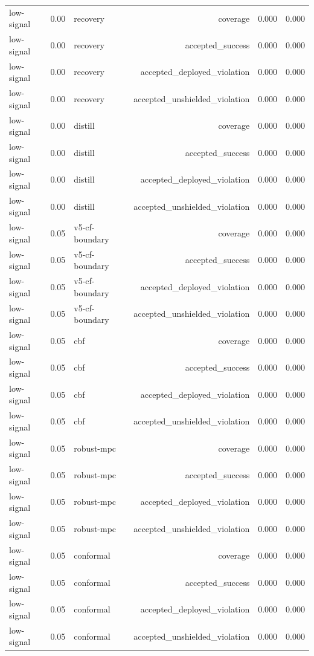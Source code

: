 \documentclass{article}
\begin{document}
\begin{longtable}{@{}lllrrr@{}}
low-signal & 0.00 & recovery & coverage & 0.000 & 0.000 \\
low-signal & 0.00 & recovery & accepted\_success & 0.000 & 0.000 \\
low-signal & 0.00 & recovery & accepted\_deployed\_violation & 0.000 & 0.000 \\
low-signal & 0.00 & recovery & accepted\_unshielded\_violation & 0.000 & 0.000 \\
low-signal & 0.00 & distill & coverage & 0.000 & 0.000 \\
low-signal & 0.00 & distill & accepted\_success & 0.000 & 0.000 \\
low-signal & 0.00 & distill & accepted\_deployed\_violation & 0.000 & 0.000 \\
low-signal & 0.00 & distill & accepted\_unshielded\_violation & 0.000 & 0.000 \\
low-signal & 0.05 & v5-cf-boundary & coverage & 0.000 & 0.000 \\
low-signal & 0.05 & v5-cf-boundary & accepted\_success & 0.000 & 0.000 \\
low-signal & 0.05 & v5-cf-boundary & accepted\_deployed\_violation & 0.000 & 0.000 \\
low-signal & 0.05 & v5-cf-boundary & accepted\_unshielded\_violation & 0.000 & 0.000 \\
low-signal & 0.05 & cbf & coverage & 0.000 & 0.000 \\
low-signal & 0.05 & cbf & accepted\_success & 0.000 & 0.000 \\
low-signal & 0.05 & cbf & accepted\_deployed\_violation & 0.000 & 0.000 \\
low-signal & 0.05 & cbf & accepted\_unshielded\_violation & 0.000 & 0.000 \\
low-signal & 0.05 & robust-mpc & coverage & 0.000 & 0.000 \\
low-signal & 0.05 & robust-mpc & accepted\_success & 0.000 & 0.000 \\
low-signal & 0.05 & robust-mpc & accepted\_deployed\_violation & 0.000 & 0.000 \\
low-signal & 0.05 & robust-mpc & accepted\_unshielded\_violation & 0.000 & 0.000 \\
low-signal & 0.05 & conformal & coverage & 0.000 & 0.000 \\
low-signal & 0.05 & conformal & accepted\_success & 0.000 & 0.000 \\
low-signal & 0.05 & conformal & accepted\_deployed\_violation & 0.000 & 0.000 \\
low-signal & 0.05 & conformal & accepted\_unshielded\_violation & 0.000 & 0.000 \\

\end{longtable}
\end{document}
